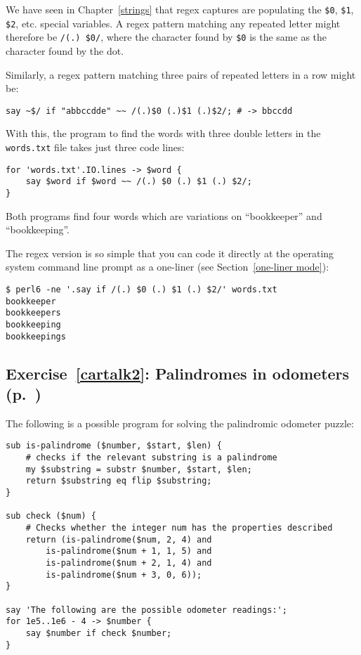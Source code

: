We have seen in Chapter~\ref{strings} that regex captures are 
populating the \verb'$0', \verb'$1', \verb'$2', etc. special 
variables. A regex pattern matching any repeated letter might 
therefore be \verb'/(.) $0/', where the character found 
by \verb'$0' is the same as the character found by the dot. 

Similarly, a regex pattern matching three pairs of repeated 
letters in a row might be:
\begin{verbatim}
say ~$/ if "abbccdde" ~~ /(.)$0 (.)$1 (.)$2/; # -> bbccdd 
\end{verbatim}

With this, the program to find the words with three double 
letters in the {\tt words.txt} file takes just three code 
lines:

\begin{verbatim}
for 'words.txt'.IO.lines -> $word {
    say $word if $word ~~ /(.) $0 (.) $1 (.) $2/;
}
\end{verbatim}
%

Both programs find four words which are variations on 
``bookkeeper'' and ``bookkeeping''.

The regex version is so simple that you can code it directly 
at the operating system command line prompt as a one-liner (see Section~\ref{one-liner mode}):

\begin{verbatim}
$ perl6 -ne '.say if /(.) $0 (.) $1 (.) $2/' words.txt
bookkeeper
bookkeepers
bookkeeping
bookkeepings
\end{verbatim}


\subsection{Exercise~\ref{cartalk2}: Palindromes in odometers (p.~\pageref{cartalk2})}
\label{sol_cartalk2}

The following is a possible program for solving the 
palindromic odometer puzzle:

\begin{verbatim}
sub is-palindrome ($number, $start, $len) {
    # checks if the relevant substring is a palindrome
    my $substring = substr $number, $start, $len;
    return $substring eq flip $substring;
}
    
sub check ($num) {
    # Checks whether the integer num has the properties described
    return (is-palindrome($num, 2, 4) and
        is-palindrome($num + 1, 1, 5) and
        is-palindrome($num + 2, 1, 4) and
        is-palindrome($num + 3, 0, 6));
}

say 'The following are the possible odometer readings:';
for 1e5..1e6 - 4 -> $number {
    say $number if check $number;
}
\end{verbatim}

